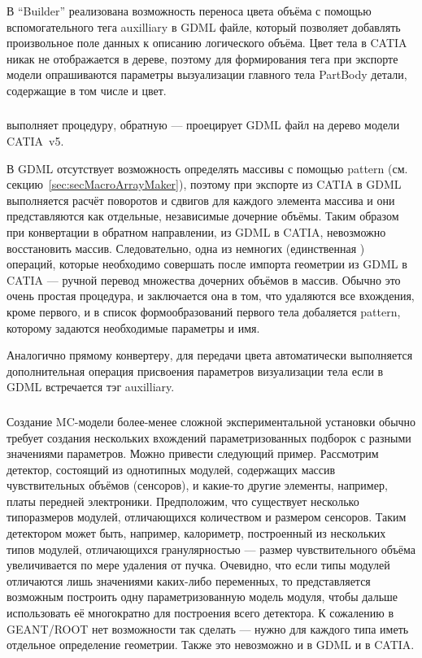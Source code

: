 В ``Builder'' реализована возможность переноса цвета объёма с помощью вспомогательного тега auxilliary в GDML файле, который позволяет добавлять произвольное поле данных к описанию логического объёма. Цвет тела в CATIA никак не отображается в дереве, поэтому для формирования тега при экспорте модели опрашиваются параметры вызуализации главного тела PartBody детали, содержащие в том числе и цвет.

\subsubsection{}\label{sec:GDML2CATIA}

 выполняет процедуру, обратную  --- проецирует GDML файл на дерево модели CATIA~v5.

В GDML отсутствует возможность определять массивы с помощью pattern (см. секцию~\ref{sec:secMacroArrayMaker}),
поэтому при экспорте из CATIA в GDML выполняется расчёт поворотов и сдвигов для каждого элемента массива и они представляются как отдельные, независимые дочерние объёмы. Таким образом при конвертации в обратном направлении, из GDML в CATIA, невозможно восстановить массив. Следовательно, одна из немногих (единственная \todo) операций, которые необходимо совершать после импорта геометрии из GDML в CATIA --- ручной перевод множества дочерних объёмов в массив. Обычно это очень простая процедура, и заключается она в том, что удаляются все вхождения, кроме первого, и в список формообразований первого тела добаляется pattern, которому задаются необходимые параметры и имя.

Аналогично прямому конвертеру, для передачи цвета автоматически выполняется дополнительная операция присвоения параметров визуализации тела если в GDML встречается тэг auxilliary.

\subsubsection{}\label{sec:Duplicator}

Создание MC-модели более-менее сложной экспериментальной установки обычно требует создания нескольких вхождений параметризованных подборок с разными значениями параметров. Можно привести следующий пример. Рассмотрим детектор, состоящий из однотипных модулей, содержащих массив чувствительных объёмов (сенсоров), и какие-то другие элементы, например, платы передней электроники. Предположим, что существует несколько типоразмеров модулей, отличающихся количеством и размером сенсоров. Таким детектором может быть, например, калориметр, построенный из нескольких типов модулей, отличающихся гранулярностью --- размер чувствительного объёма увеличивается по мере удаления от пучка. Очевидно, что если типы модулей отличаются лишь значениями каких-либо переменных, то представляется возможным построить одну параметризованную модель модуля, чтобы дальше использовать её многократно для построения всего детектора. К сожалению в GEANT/ROOT нет возможности так сделать --- нужно для каждого типа иметь отдельное определение геометрии. Также это невозможно и в GDML и в CATIA.

